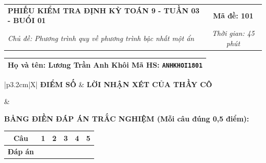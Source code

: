 \documentclass[12pt,a4paper]{article}
\begin{document}
\newpage



\noindent
\begin{tabularx}{\linewidth}{|X|c|}
\hline
\textbf{PHIẾU KIỂM TRA ĐỊNH KỲ TOÁN 9 - TUẦN 03 - BUỔI 01} & \textbf{Mã đề: 101} \\
\textit{Chủ đề: Phương trình quy về phương trình bậc nhất một ẩn} & \textit{Thời gian: 45 phút} \\
\hline
\end{tabularx}

\vspace{1mm}

\noindent
\begin{tabularx}{\linewidth}{|X|}
\hline
\rule[-2mm]{0pt}{7.5mm}\textbf{Họ và tên:} \textbf{\large Lương Trần Anh Khôi} \hfill \textbf{Mã HS:} \texttt{ANHKHOI1801} \quad \\
\hline
\end{tabularx}

\vspace{1mm}

\noindent
\begin{tabularx}{\linewidth}{|p{3.2cm}|X|}
\hline
\centering\textbf{ĐIỂM SỐ} & \centering\textbf{LỜI NHẬN XÉT CỦA THẦY CÔ} \tabularnewline
\hline
\rule{0pt}{1.3cm} & \tabularnewline
\hline
\end{tabularx}

\vspace{1.2mm}

\noindent\textbf{BẢNG ĐIỀN ĐÁP ÁN TRẮC NGHIỆM (Mỗi câu đúng 0,5 điểm):}
\vspace{0.8mm}

\noindent
\renewcommand{\arraystretch}{1.35}
\begin{tabularx}{\linewidth}{|c|*{5}{>{\centering\arraybackslash}X|}}
\hline
\textbf{Câu} & \textbf{1} & \textbf{2} & \textbf{3} & \textbf{4} & \textbf{5} \\
\hline
\textbf{Đáp án} & & & & & \\
\hline
\end{tabularx}
\renewcommand{\arraystretch}{1.0}

\vspace{1.5mm}
\end{document}
